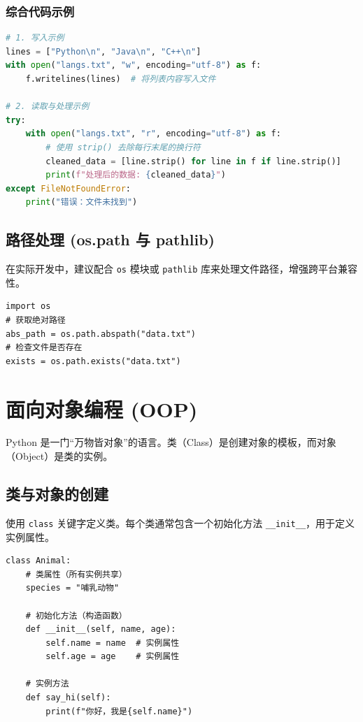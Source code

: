 \documentclass{article}
\begin{document}
\subsubsection{综合代码示例}

\begin{lstlisting}[language=Python]
# 1. 写入示例
lines = ["Python\n", "Java\n", "C++\n"]
with open("langs.txt", "w", encoding="utf-8") as f:
    f.writelines(lines)  # 将列表内容写入文件

# 2. 读取与处理示例
try:
    with open("langs.txt", "r", encoding="utf-8") as f:
        # 使用 strip() 去除每行末尾的换行符
        cleaned_data = [line.strip() for line in f if line.strip()]
        print(f"处理后的数据: {cleaned_data}")
except FileNotFoundError:
    print("错误：文件未找到")
\end{lstlisting}

\subsection{路径处理 (os.path 与 pathlib)}
在实际开发中，建议配合 \texttt{os} 模块或 \texttt{pathlib} 库来处理文件路径，增强跨平台兼容性。

\begin{lstlisting}
import os
# 获取绝对路径
abs_path = os.path.abspath("data.txt")
# 检查文件是否存在
exists = os.path.exists("data.txt")
\end{lstlisting}

\section{面向对象编程 (OOP)}

Python 是一门“万物皆对象”的语言。类（Class）是创建对象的模板，而对象（Object）是类的实例。

\subsection{类与对象的创建}
使用 \texttt{class} 关键字定义类。每个类通常包含一个初始化方法 \texttt{\_\_init\_\_}，用于定义实例属性。

\begin{lstlisting}
class Animal:
    # 类属性（所有实例共享）
    species = "哺乳动物"

    # 初始化方法（构造函数）
    def __init__(self, name, age):
        self.name = name  # 实例属性
        self.age = age    # 实例属性

    # 实例方法
    def say_hi(self):
        print(f"你好，我是{self.name}")
\end{lstlisting}
\end{document}
